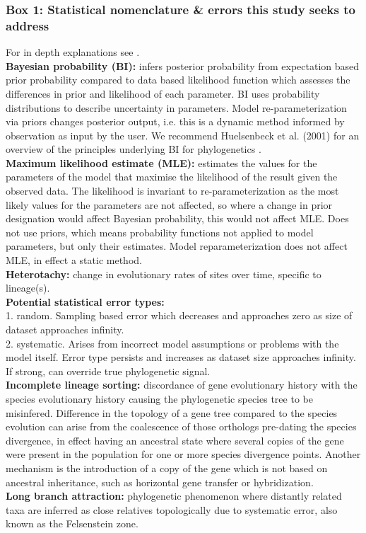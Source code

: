 \documentclass[12pt]{article}
\begin{document}
\subsubsection*{Box 1: Statistical nomenclature \& errors this study seeks to address}
For in depth explanations see \cite{yang2014molecular}.\\
\textbf{Bayesian probability (BI):} infers posterior probability from expectation based prior probability compared to data based likelihood function which assesses the differences in prior and likelihood of each parameter.
BI uses probability distributions to describe uncertainty in parameters.
Model re-parameterization via priors changes posterior output, i.e. this is a dynamic method informed by observation as input by the user. 
We recommend Huelsenbeck et al. (2001) for an overview of the principles underlying BI for phylogenetics \cite{huelsenbeck2001bayesian}.\\
\textbf{Maximum likelihood estimate (MLE):} estimates the values for the parameters of the model that maximise the likelihood of the result given the observed data. 
The likelihood is invariant to re-parameterization as the most likely values for the parameters are not affected, so where a change in prior designation would affect Bayesian probability, this would not affect MLE.
Does not use priors, which means probability functions not applied to model parameters, but only their estimates. 
Model reparameterization does not affect MLE, in effect a static method.\\
\textbf{Heterotachy:} change in evolutionary rates of sites over time, specific to lineage(s).\\
\textbf{Potential statistical error types:}\\
1. random. Sampling based error which decreases and approaches zero as size of dataset approaches infinity.\\
2. systematic. Arises from incorrect model assumptions or problems with the model itself. 
Error type persists and increases as dataset size approaches infinity. 
If strong, can override true phylogenetic signal.\\
\textbf{Incomplete lineage sorting:} discordance of gene evolutionary history with the species evolutionary history causing the phylogenetic species tree to be misinfered. 
Difference in the topology of a gene tree compared to the species evolution can arise from the coalescence of those orthologs pre-dating the species divergence, in effect having an ancestral state where several copies of the gene were present in the population for one or more species divergence points. 
Another mechanism is the introduction of a copy of the gene which is not based on ancestral inheritance, such as horizontal gene transfer or hybridization.\\
\textbf{Long branch attraction:} phylogenetic phenomenon where distantly related taxa are inferred as close relatives topologically due to systematic error, also known as the Felsenstein zone.
\end{document}

